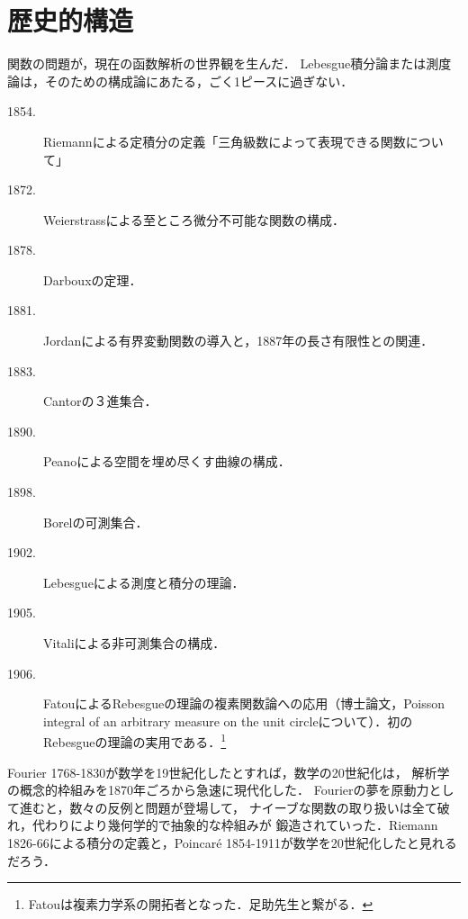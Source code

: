 \documentclass[uplatex, dvipdfmx]{jsreport}
\begin{document}
\section{歴史的構造}

\begin{tcolorbox}[colframe=ForestGreen, colback=ForestGreen!10!white,breakable,colbacktitle=ForestGreen!40!white,coltitle=black,fonttitle=\bfseries\sffamily,
title=]
    関数の問題が，現在の函数解析の世界観を生んだ．
    Lebesgue積分論または測度論は，そのための構成論にあたる，ごく1ピースに過ぎない．
\end{tcolorbox}

\begin{history}[年表]\mbox{}
    \begin{description}
        \item[1854.] Riemannによる定積分の定義「三角級数によって表現できる関数について」
        \item[1872.] Weierstrassによる至ところ微分不可能な関数の構成．
        \item[1878.] Darbouxの定理．
        \item[1881.] Jordanによる有界変動関数の導入と，1887年の長さ有限性との関連．
        \item[1883.] Cantorの３進集合．
        \item[1890.] Peanoによる空間を埋め尽くす曲線の構成．
        \item[1898.] Borelの可測集合．
        \item[1902.] Lebesgueによる測度と積分の理論．
        \item[1905.] Vitaliによる非可測集合の構成．
        \item[1906.] FatouによるRebesgueの理論の複素関数論への応用（博士論文，Poisson integral of an arbitrary measure on the unit circleについて）．初のRebesgueの理論の実用である．\footnote{Fatouは複素力学系の開拓者となった．足助先生と繋がる．}
    \end{description}
\end{history}

\begin{history}[Bourbakiによる近代解析学]
    Fourier 1768-1830が数学を19世紀化したとすれば，数学の20世紀化は，
    解析学の概念的枠組みを1870年ごろから急速に現代化した．
    Fourierの夢を原動力として進むと，数々の反例と問題が登場して，
    ナイーブな関数の取り扱いは全て破れ，代わりにより幾何学的で抽象的な枠組みが
    鍛造されていった．Riemann 1826-66による積分の定義と，Poincaré 1854-1911が数学を20世紀化したと見れるだろう．
\end{history}
\end{document}
